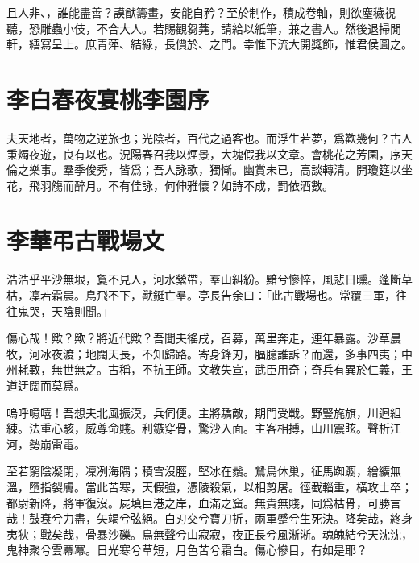 且人非、，誰能盡善？謨猷籌畫，安能自矜？至於制作，積成卷軸，則欲塵穢視聽，恐雕蟲小伎，不合大人。若賜觀芻蕘，請給{以}紙筆，兼之書人。然後退掃閒軒，繕寫呈上。庶青萍、結綠，長價於、之門。幸惟下流大開獎飾，惟君侯圖之。

\theendnotes 

\section[春夜宴桃李園序\quad{\small 李白}]{{\normalsize 李白}\quad 春夜宴桃李園序}
夫天地者，萬物之逆旅也；光陰者，百代之過客也。而浮生若夢，爲歡幾何？古人秉燭夜遊，良有以也。況陽春召我以煙景，大塊假我以文章。會桃花之芳園，序天倫之樂事。羣季俊秀，皆爲；吾人詠歌，獨慚。幽賞未已，高談轉清。開瓊筵以坐花，飛羽觴而醉月。不有佳詠，何伸雅懷？如詩不成，罰依酒數。

\section[弔古戰場文\quad{\small 李華}]{{\normalsize 李華}\quad 弔古戰場文}
浩浩乎平沙無垠，敻不見人，河水縈帶，羣山糾紛。黯兮慘悴，風悲日曛。蓬斷草枯，凜若霜晨。鳥飛不下，獸鋌亡羣。亭長告余曰：「此古戰場也。常覆三軍，往往鬼哭，天陰則聞。」

傷心哉！歟？歟？將近代歟？吾聞夫徭戌，召募，萬里奔走，連年暴露。沙草晨牧，河冰夜渡；地闊天長，不知歸路。寄身鋒刃，腷臆誰訴？而還，多事四夷；中州耗斁，無世無之。古稱，不抗王師。文教失宣，武臣用奇；奇兵有異於仁義，王道迂闊而莫爲。

嗚呼噫嘻！吾想夫北風振漠，兵伺便。主將驕敵，期門受戰。野豎旄旗，川迴組練。法重心駭，威尊命賤。利鏃穿骨，驚沙入面。主客相搏，山川震眩。聲{析}江河，勢崩雷電。

至若窮陰凝閉，凜冽海隅；積雪沒脛，堅冰在鬚。鷙鳥休巢，征馬踟躕，繒纊無溫，墮指裂膚。當此苦寒，天假強，憑陵殺氣，以相剪屠。徑截輜重，橫攻士卒；都尉新降，將軍{復}沒。屍填巨港之岸，血滿之窟。無貴無賤，同爲枯骨，可勝言哉！鼓衰兮力盡，矢竭兮弦絕。白刃交兮寶刀折，兩軍蹙兮生死決。降矣哉，終身夷狄；戰矣哉，骨暴沙礫。鳥無聲兮山寂寂，夜正長兮風淅淅。魂魄結兮天沈沈，鬼神聚兮雲冪冪。日光寒兮草短，月色苦兮霜白。傷心慘目，有如是耶？

